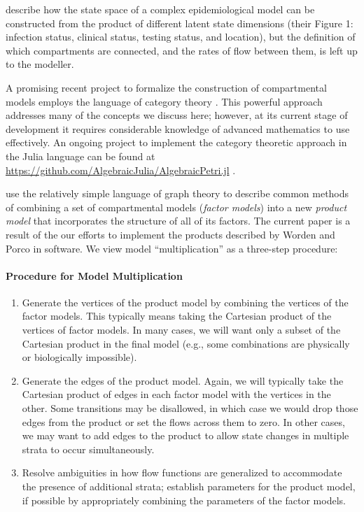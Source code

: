 \cite{friston2020dynamic} describe how the state space of a complex epidemiological model can be constructed from the product of different latent state dimensions (their Figure 1: infection status, clinical status, testing status, and location), but the definition of which compartments are connected, and the rates of flow between them, is left up to the modeller.

A promising recent project to formalize the construction of compartmental models employs the language of category theory \citep{fong2018seven, Libkind2022an, libkind2021operadic, baez2022compositional, baez2017compositional}. This powerful approach addresses many of the concepts we discuss here; however, at its current stage of development it requires considerable knowledge of advanced mathematics to use effectively.  An ongoing project to implement the category theoretic approach in the Julia language can be found at \url{https://github.com/AlgebraicJulia/AlgebraicPetri.jl} \citep{algebraicjulia}. 

\cite{worden2017products} use the relatively simple language of graph theory to describe common methods of combining a set of compartmental models (\emph{factor models}) into a new \emph{product model} that incorporates the structure of all of its factors. The current paper is a result of the our efforts to implement the products described by Worden and Porco in software. We view model ``multiplication'' as a three-step procedure:

\paragraph{Procedure for Model Multiplication}\label{genproc}

\begin{enumerate}
    \item Generate the vertices of the product model by combining the vertices of the factor models. This typically means taking the Cartesian product of the vertices of factor models. In many cases, we will want only a subset of the Cartesian product in the final model (e.g., some combinations are physically or biologically impossible).
    \item Generate the edges of the product model. Again, we will typically take the Cartesian product of edges in each factor model with the vertices in the other. Some transitions may be disallowed, in which case we would drop those edges from the product or set the flows across them to zero. In other cases, we may want to add edges to the product to allow state changes in multiple strata to occur simultaneously.
    \item Resolve ambiguities in how flow functions are generalized to accommodate the presence of additional strata; establish parameters for the product model, if possible by appropriately combining the parameters of the factor models.
\end{enumerate}


